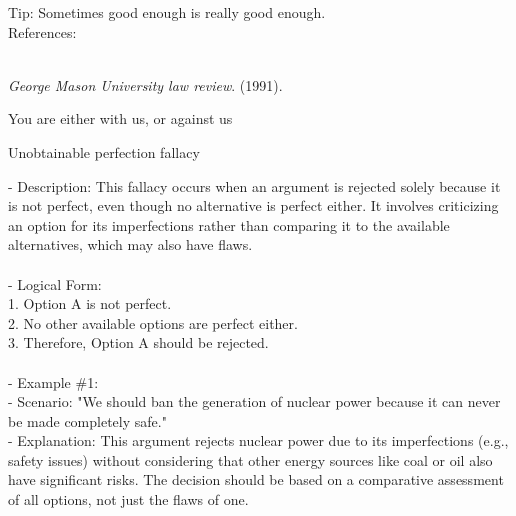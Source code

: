 \documentclass[a4paper,12pt,single,pdftex]{scrbook}
\begin{document}
{    
      Tip: Sometimes good enough is really good enough.
    \\

    References:

    
      
        
      \\

      
        
          {\it George Mason University law review}. (1991).
        
      
    
  }


You are either with us, or against us

Unobtainable perfection fallacy
    
      - Description: This fallacy occurs when an argument is rejected solely because it is not perfect, even though no alternative is perfect either. It involves criticizing an option for its imperfections rather than comparing it to the available alternatives, which may also have flaws.
    \\

    
      
    \\

    
      - Logical Form:
    \\

    
        1. Option A is not perfect.
    \\

    
        2. No other available options are perfect either.
    \\

    
        3. Therefore, Option A should be rejected.
    \\

    
      
    \\

    
      - Example \#1:
    \\

    
        - Scenario: "We should ban the generation of nuclear power because it can never be made completely safe."
    \\

    
        - Explanation: This argument rejects nuclear power due to its imperfections (e.g., safety issues) without considering that other energy sources like coal or oil also have significant risks. The decision should be based on a comparative assessment of all options, not just the flaws of one.
    \\
\end{document}
